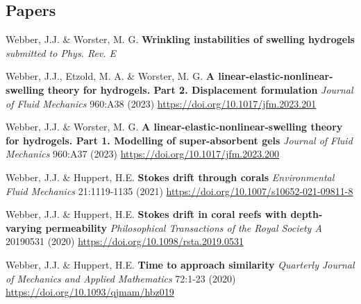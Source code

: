 \documentclass[a4paper]{article}
\begin{document}
\begin{multicols}{2}
            \subsection*{Papers}
            \begin{small}
                \begin{itemize}
                    {\color{gray}\item Webber, J.J. \& Worster, M. G. \textbf{Wrinkling instabilities of swelling hydrogels} \emph{submitted to Phys. Rev. E}}
                    \item Webber, J.J., Etzold, M. A. \& Worster, M. G. \textbf{A linear-elastic-nonlinear-swelling theory for hydrogels. Part 2. Displacement formulation} \emph{Journal of Fluid Mechanics} 960:A38 (2023) \href{https://doi.org/10.1017/jfm.2023.201}{https://doi.org/10.1017/jfm.2023.201}
                    \item Webber, J.J. \& Worster, M. G. \textbf{A linear-elastic-nonlinear-swelling theory for hydrogels. Part 1. Modelling of super-absorbent gels} \emph{Journal of Fluid Mechanics} 960:A37 (2023) \href{https://doi.org/10.1017/jfm.2023.200}{https://doi.org/10.1017/jfm.2023.200}
                    \item Webber, J.J. \& Huppert, H.E. \textbf{Stokes drift through corals} \emph{Environmental Fluid Mechanics} 21:1119-1135 (2021) \href{https://doi.org/10.1007/s10652-021-09811-8}{https://doi.org/10.1007/s10652-021-09811-8}
                    \item Webber, J.J. \& Huppert, H.E. \textbf{Stokes drift in coral reefs with depth-varying permeability} \emph{Philosophical Transactions of the Royal Society A} 20190531 (2020) \href{https://doi.org/10.1098/rsta.2019.0531}{https://doi.org/10.1098/rsta.2019.0531}
                    \item Webber, J.J. \& Huppert, H.E. \textbf{Time to approach similarity} \emph{Quarterly Journal of Mechanics and Applied Mathematics} 72:1-23 (2020) \href{https://doi.org/10.1093/qjmam/hbz019}{https://doi.org/10.1093/qjmam/hbz019}
                \end{itemize}
            \end{small}
    \end{multicols}
\end{document}
